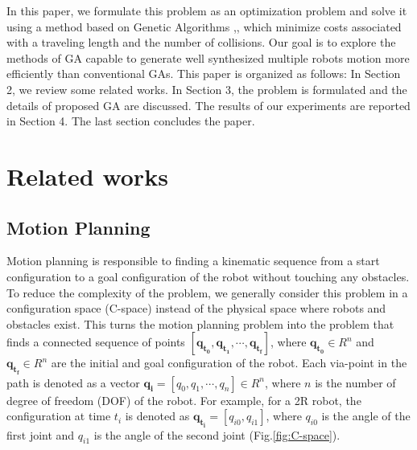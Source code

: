 \documentclass[12pt]{article} %
\begin{document}
In this paper, we formulate this problem as an optimization problem and solve it using a method based on Genetic Algorithms \cite{Holland},\cite{David}, which minimize costs associated with a traveling length and the number of collisions. Our goal is to explore the methods of GA capable to generate well synthesized multiple robots motion more efficiently than conventional GAs. This paper is organized as follows: In Section 2, we review some related works. In Section 3, the problem is formulated and the details of proposed GA are discussed. The results of our experiments are reported in Section 4. The last section concludes the paper.



\section{Related works} %

\subsection{Motion Planning}
Motion planning is responsible to finding a kinematic sequence from a start configuration to a goal configuration of the robot without touching any obstacles. To reduce the complexity of the problem, we generally consider this problem in a configuration space (C-space)\cite{Lozano} instead of the physical space where robots and obstacles exist. This turns the motion planning problem into the problem that finds a connected sequence of points $[\bm{q_{t_0}}, \bm{q_{t_1}}, \cdots ,\bm{q_{t_f}}]$, where $\bm{q_{t_0}} \in R^n$ and $\bm{q_{t_f}}\in R^n$ are the initial and goal configuration of the robot. Each via-point in the path is denoted as a vector $\bm{q_{i}}=[q_0, q_1, \cdots ,q_{n}] \in R^n$, where $n$ is the number of degree of freedom (DOF) of the robot. For example, for a 2R robot, the configuration at time $t_i$ is denoted as $\bm{q_{t_i}} = [q_{i0}, q_{i1}]$, where $q_{i0}$ is the angle of the first joint and $q_{i1}$ is the angle of the second joint (Fig.\ref{fig:C-space}).  
\end{document}

